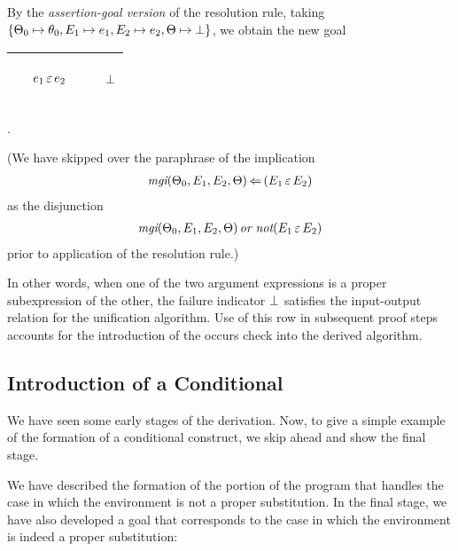 \documentclass[runningheads]{llncs}
\DeclareMathOperator{\uor}{\emph{or}\,}
\DeclareMathOperator{\unot}{\emph{not}\kern-.0pt}
\DeclareMathOperator{\uimpliedby}{\Leftarrow}
\DeclareMathOperator{\mgi}{\emph{mgi}}
\begin{document}
By the \emph{assertion-goal version} of the resolution rule, taking 
$\{\Theta_{0} \mapsto \theta_{0}, E_{1} \mapsto e_{1}, E_{2} \mapsto e_{2}, \Theta \mapsto \bot\}$, we obtain the new goal
\begin{center}
\begin{tabular}{T}
 \hline 
  & 
  \begin{center}
${\begin{aligned} 
&\begin{aligned}
  \,\, & {e_{1} \, \varepsilon \, e_{2}}
\end{aligned}\end{aligned}}$\hspace{1cm} 
\end{center} & \begin{center}$\bot$ \end{center} \\
\hline
\end{tabular}.
\end{center}
(We have skipped over the paraphrase of the implication  \[\begin{aligned}
 {\mgi}(\Thet{0}, \E{1}, \E{2}, \Theta)  \uimpliedby \,
(\E{1} \occursin \E{2})
   \end{aligned}\]
   as the disjunction \[\begin{aligned}
 {\mgi}(\Thet{0}, \E{1}, \E{2}, \Theta)  \uor 
\unot(\E{1} \occursin \E{2})
   \end{aligned}\]
prior to application of the resolution rule.)

In other words, when one of the two argument expressions is a proper subexpression of the other, the failure indicator $\bot$ satisfies the input-output relation for the unification algorithm. Use of this row in subsequent proof steps accounts for the introduction of the occurs check into the derived algorithm.



\subsection{Introduction of a Conditional}

We have seen some early stages of the derivation.  Now, to give a simple example of the formation of a conditional construct, we skip ahead and show the final stage.  

We have described the formation of the portion of the program that handles the case in which the environment is not a proper substitution. In the final stage, we have also developed a goal that corresponds to the case in which the environment is indeed a proper substitution:
\end{document}
